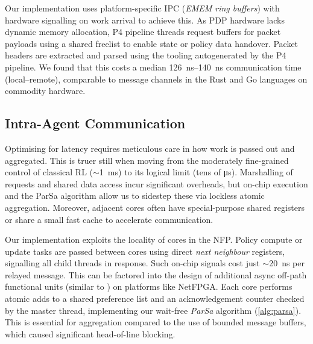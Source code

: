 \documentclass[
conference
,10pt
]{IEEEtran}
\newcommand{\approachshort}{OPaL}
\begin{document}
Our implementation uses platform-specific IPC (\emph{EMEM ring buffers}) with hardware signalling on work arrival to achieve this.
As PDP hardware lacks dynamic memory allocation, P4 pipeline threads request buffers for packet payloads using a shared freelist to enable state or policy data handover.
Packet headers are extracted and parsed using the tooling autogenerated by the P4 pipeline.
We found that this costs a median \SIrange{126}{140}{\nano\second} communication time (local--remote), comparable to message channels in the Rust and Go languages on commodity hardware.


\subsection{Intra-Agent Communication}\label{sec:intra-agent-communication}
Optimising for latency requires meticulous care in how work is passed out and aggregated.
This is truer still when moving from the moderately fine-grained control of classical RL ($\sim$\SI{1}{\milli\second}) to its logical limit (tens of \si{\micro\second}).
Marshalling of requests and shared data access incur significant overheads, but on-chip execution and the ParSa algorithm allow us to sidestep these via lockless atomic aggregation.
Moreover, adjacent cores often have special-purpose shared registers or share a small fast cache to accelerate communication.


Our implementation exploits the locality of cores in the NFP. 
Policy compute or update tasks are passed between cores using direct \emph{next neighbour} registers, signalling all child threads in response.
Such on-chip signals cost just $\sim$\SI{20}{\nano\second} per relayed message.
This can be factored into the design of additional async off-path functional units (similar to \textcite{DBLP:conf/isca/LiLYCSH19}) on platforms like NetFPGA.
Each core performs atomic adds to a shared preference list and an acknowledgement counter checked by the master thread, implementing our wait-free \emph{ParSa} algorithm (\cref{alg:parsa}).
This is essential for aggregation compared to the use of bounded message buffers, which caused significant head-of-line blocking.
\end{document}
